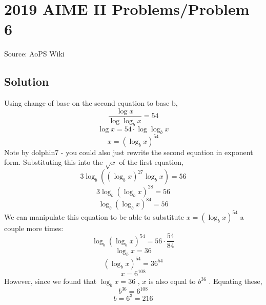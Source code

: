 \documentclass[12pt]{article}
\begin{document}
\section*{{2019 AIME II Problems/Problem 6}}
Source: AoPS Wiki

\subsection*{Solution}
Using change of base on the second equation to base b, \[\frac{\log x}{\log \log_{b}{x}}=54\] \[\log x = 54 \cdot \log\log_{b}{x}\] \[x = (\log_{b}{x})^{54}\] Note by dolphin7 - you could also just rewrite the second equation in exponent form. Substituting this into the $\sqrt x$ of the first equation, \[3\log_{b}{((\log_{b}{x})^{27}\log_{b}{x})} = 56\] \[3\log_{b}{(\log_{b}{x})^{28}} = 56\] \[\log_{b}{(\log_{b}{x})^{84}} = 56\] We can manipulate this equation to be able to substitute $x = (\log_{b}{x})^{54}$ a couple more times: \[\log_{b}{(\log_{b}{x})^{54}} = 56 \cdot \frac{54}{84}\] \[\log_{b}{x} = 36\] \[(\log_{b}{x})^{54} = 36^{54}\] \[x = 6^{108}\] However, since we found that $\log_{b}{x} = 36$ , $x$ is also equal to $b^{36}$ . Equating these, \[b^{36} = 6^{108}\] \[b = 6^3 = \boxed{216}\]
\end{document}
